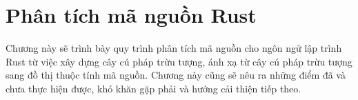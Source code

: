 \chapter{Phân tích mã nguồn Rust}
\label{chap:method}

Chương này sẽ trình bày quy trình phân tích mã nguồn cho ngôn ngữ lập trình Rust từ việc xây dựng cây cú pháp trừu tượng, ánh xạ từ cây cú pháp trừu tượng sang đồ thị thuộc tính mã nguồn.
Chương này cũng sẽ nêu ra những điểm đã và chưa thực hiện được, khó khăn gặp phải và hướng cải thiện tiếp theo.






